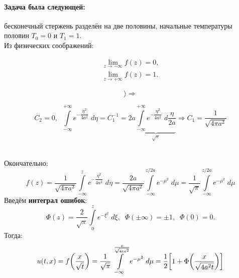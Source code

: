 \paragraph{Задача была следующей:} бесконечный стержень разделён на две половины, начальные температуры половин $T_0 = 0$ и $T_1 = 1$. \\
Из физических соображений: \\
\begin{minipage}[c]{0.2\textwidth}
\begin{flushright}
\begin{align*}
	\lim\limits_{z \to - \infty} f(z) = 0, \\
	\lim\limits_{z \to + \infty} f(z) = 1.
\end{align*}
\end{flushright}
\end{minipage}
\begin{minipage}[c]{0\textwidth}
$$\biggr\rangle \Longrightarrow$$
\end{minipage}
\begin{minipage}[c]{0.7\textwidth}
\vspace{30pt}
$$\boxed{C_2 = 0}, \; \; \int\limits_{-\infty}^{+\infty} e^{-\dfrac{\eta^2}{4a^2}}\;d \eta = C_1^{-1} = 2a \underbrace{\int\limits_{-\infty}^{+\infty} e^{-\dfrac{\eta^2}{4a^2}}\;d \dfrac{\eta}{2a}}_{\sqrt{\pi}} \Rightarrow \boxed{C_1 = \dfrac{1}{\sqrt{4 \pi a^2}}}$$
\end{minipage} \\
Окончательно:
\begin{equation*}
	f(z) = \dfrac{1}{\sqrt{4 \pi a^2}}\int\limits_{-\infty}^{z} e^{-\dfrac{\eta^2}{4a^2}}\;d \eta = \dfrac{2a}{\sqrt{4 \pi a^2}} \int\limits_{-\infty}^{z/2a}e^{-\mu^2}\;d \mu = \dfrac{1}{\sqrt{\pi}} \int\limits_{-\infty}^{z/2a}e^{-\mu^2}\;d \mu 
\end{equation*}
Введём \textbf{интеграл ошибок}:
\begin{equation*}
	\Phi(z) = \dfrac{2}{\sqrt{\pi}} \int\limits_{0}^{z}e^{-\xi^2}\;d \xi,\; \; \Phi(\pm \infty) = \pm 1,\; \; \Phi(0) = 0. 
\end{equation*}
Тогда:
\begin{equation*}
	u(t, x) = f\biggl(\dfrac{x}{\sqrt{t}}\biggr) = \dfrac{1}{\sqrt{\pi}} \int\limits_{-\infty}^{\frac{x}{\sqrt{4 t a^2}}} e^{-\mu^2}\;d \mu = \dfrac{1}{2}\biggl[1 + \Phi\biggl(\dfrac{x}{\sqrt{4 a^2 t}}\biggr)\biggr]
\end{equation*}
